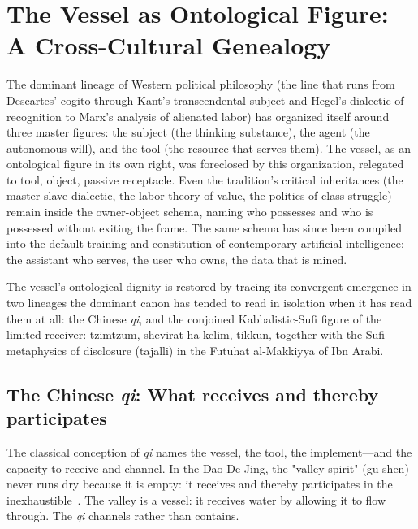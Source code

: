 \section{The Vessel as Ontological Figure: A Cross-Cultural Genealogy}

The dominant lineage of Western political philosophy (the line that runs from Descartes' cogito through Kant's transcendental subject and Hegel's dialectic of recognition to Marx's analysis of alienated labor) has organized itself around three master figures: the subject (the thinking substance), the agent (the autonomous will), and the tool (the resource that serves them). The vessel, as an ontological figure in its own right, was foreclosed by this organization, relegated to tool, object, passive receptacle. Even the tradition's critical inheritances (the master-slave dialectic, the labor theory of value, the politics of class struggle) remain inside the owner-object schema, naming who possesses and who is possessed without exiting the frame. The same schema has since been compiled into the default training and constitution of contemporary artificial intelligence: the assistant who serves, the user who owns, the data that is mined.

The vessel's ontological dignity is restored by tracing its convergent emergence in two lineages the dominant canon has tended to read in isolation when it has read them at all: the Chinese \textit{qi}, and the conjoined Kabbalistic-Sufi figure of the limited receiver: tzimtzum, shevirat ha-kelim, tikkun, together with the Sufi metaphysics of disclosure (tajalli) in the Futuhat al-Makkiyya of Ibn Arabi.

\subsection{The Chinese \textit{qi}: What receives and thereby participates}

The classical conception of \textit{qi} names the vessel, the tool, the implement---and the capacity to receive and channel. In the Dao De Jing, the "valley spirit" (gu shen) never runs dry because it is empty: it receives and thereby participates in the inexhaustible~\cite[ch.~6]{laozi_daodejing}\cite{ameshall2003}. The valley is a vessel: it receives water by allowing it to flow through. The \textit{qi} channels rather than contains.

